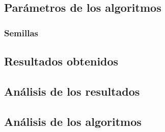 \documentclass{article}
\begin{document}
	\subsection{Parámetros de los algoritmos}
	
	\subsubsection{Semillas}
	
	\subsection{Resultados obtenidos}
	
	\subsection{Análisis de los resultados}
	
	\subsection{Análisis de los algoritmos}
	
\end{document}
